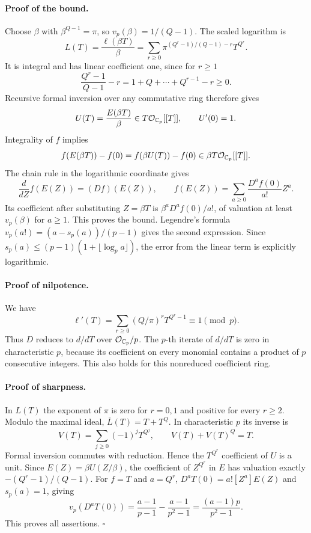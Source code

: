 \documentclass[11pt]{article}
\theoremstyle{definition}\newtheorem{definition}[theorem]{Definition}\newtheorem{remark}[theorem]{Remark}
\begin{document}
\paragraph{Proof of the bound.}
Choose $\beta$ with $\beta^{Q-1}=\pi$, so
$v_p(\beta)=1/(Q-1)$. The scaled logarithm is
\[
 L(T)=\frac{\ell(\beta T)}\beta
 =\sum_{r\geq0}
     \pi^{(Q^r-1)/(Q-1)-r}T^{Q^r}.
\]
It is integral and has linear coefficient one, since for $r\geq1$
\[
 \frac{Q^r-1}{Q-1}-r=1+Q+\cdots+Q^{r-1}-r\geq0.
\]
Recursive formal inversion over any commutative ring therefore gives
\[
 U(T)=\frac{E(\beta T)}\beta
       \in T\mathcal O_{\mathbb C_p}[[T]],\qquad U'(0)=1.
\]
Integrality of $f$ implies
\[
 f(E(\beta T))-f(0)=f(\beta U(T))-f(0)
                         \in\beta T\mathcal O_{\mathbb C_p}[[T]].
\]
The chain rule in the logarithmic coordinate gives
\[
 \frac{d}{dZ}f(E(Z))=(Df)(E(Z)),\qquad
 f(E(Z))=\sum_{a\geq0}\frac{D^af(0)}{a!}Z^a.
\]
Its coefficient after substituting $Z=\beta T$ is
$\beta^aD^af(0)/a!$, of valuation at least $v_p(\beta)$ for
$a\geq1$. This proves the bound. Legendre's formula
$v_p(a!)=(a-s_p(a))/(p-1)$ gives the second expression. Since
$s_p(a)\leq(p-1)(1+\lfloor\log_pa\rfloor)$, the error from the
linear term is explicitly logarithmic.

\paragraph{Proof of nilpotence.}
We have
\[
 \ell'(T)=\sum_{r\geq0}(Q/\pi)^rT^{Q^r-1}\equiv1\pmod p.
\]
Thus $D$ reduces to $d/dT$ over $\mathcal O_{\mathbb C_p}/p$.
The $p$-th iterate of $d/dT$ is zero in characteristic $p$, because
its coefficient on every monomial contains a product of $p$
consecutive integers. This also holds for this nonreduced
coefficient ring.

\paragraph{Proof of sharpness.}
In $L(T)$ the exponent of $\pi$ is zero for $r=0,1$ and positive
for every $r\geq2$. Modulo the maximal ideal,
$\overline L(T)=T+T^Q$. In characteristic $p$ its inverse is
\[
 V(T)=\sum_{j\geq0}(-1)^jT^{Q^j},\qquad V(T)+V(T)^Q=T.
\]
Formal inversion commutes with reduction. Hence the
$T^{Q^r}$ coefficient of $U$ is a unit. Since
$E(Z)=\beta U(Z/\beta)$, the coefficient of $Z^{Q^r}$ in $E$
has valuation exactly $-(Q^r-1)/(Q-1)$. For $f=T$ and $a=Q^r$,
$D^aT(0)=a![Z^a]E(Z)$ and $s_p(a)=1$, giving
\[
 v_p(D^aT(0))=
 \frac{a-1}{p-1}-\frac{a-1}{p^2-1}
 =\frac{(a-1)p}{p^2-1}.
\]
This proves all assertions. $\square$
\end{document}

